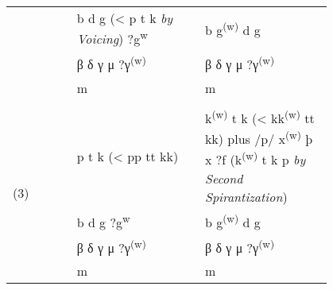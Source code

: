 {\begin{table}[H]
\begin{tabular}{lp{0.4\linewidth}p{0.4\linewidth}}
 & b d g (< p t k \textit{by Voicing}) ?g\textsuperscript{w} & b g\textsuperscript{(w)} d g \\
 & β δ γ μ ?γ\textsuperscript{(w)} & β δ γ μ ?γ\textsuperscript{(w)} \\
 & m & m \\\\
\multirow{4}{*}{(3)} & p t k (< pp tt kk) & k\textsuperscript{(w)} t k (< kk\textsuperscript{(w)} tt kk) plus /p/ x\textsuperscript{(w)} þ x ?f (k\textsuperscript{(w)} t k p \textit{by Second Spirantization}) \\
 & b d g ?g\textsuperscript{w} & b g\textsuperscript{(w)} d g \\
 & β δ γ μ ?γ\textsuperscript{(w)} & β δ γ μ ?γ\textsuperscript{(w)} \\
 & m & m
\end{tabular}
\end{table}


}
